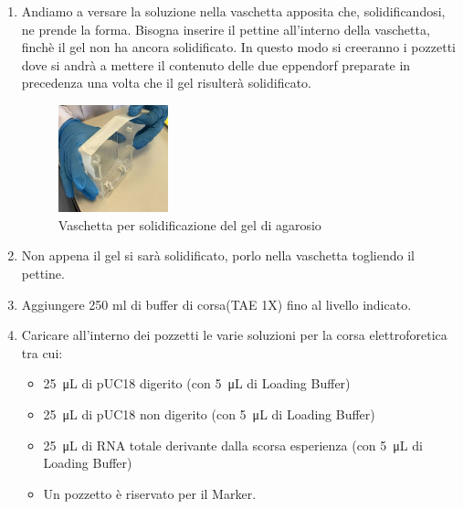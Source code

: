 \begin{enumerate}
	\item Andiamo a versare la soluzione nella vaschetta apposita che,
	solidificandosi, ne prende la forma.
	Bisogna inserire il pettine all'interno della vaschetta,
	finch\`e il gel non ha ancora solidificato.
	In questo modo si creeranno i pozzetti dove si andrà a mettere il contenuto delle
	due eppendorf preparate in precedenza una volta che il gel risulter\`a solidificato.

	\begin{figure}[H]

		\centering
		\includegraphics[width=0.3\textwidth]{./immagini/vaschetta.jpg}
		\caption{Vaschetta per solidificazione del gel di agarosio}
		\label{vaschetta}

	\end{figure}


	\item Non appena il gel si sarà solidificato, porlo nella vaschetta togliendo il pettine.
	\item Aggiungere 250 ml di buffer di corsa(TAE 1X) fino al livello indicato.
	\item Caricare all'interno dei pozzetti le varie soluzioni per la corsa elettroforetica tra cui:

	\begin{itemize}

		\item \SI{25}{\micro\liter} di pUC18 digerito (con \SI{5}{\micro\liter} di Loading Buffer)
		\item \SI{25}{\micro\liter} di pUC18 non digerito (con \SI{5}{\micro\liter} di Loading Buffer)
		\item \SI{25}{\micro\liter} di RNA totale derivante dalla scorsa esperienza
		(con \SI{5}{\micro\liter} di Loading Buffer)
		\item Un pozzetto è riservato per il Marker.

	\end{itemize}


\end{enumerate}
